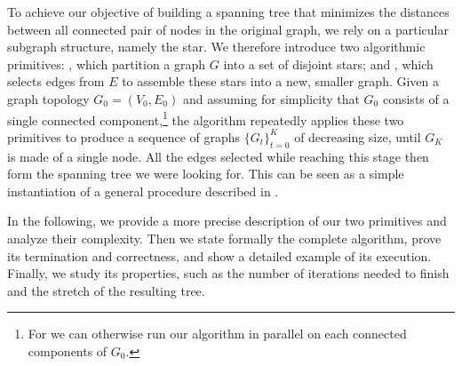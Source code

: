 To achieve our objective of building a spanning tree that minimizes the distances between all
connected pair of nodes in the original graph, we rely on a particular subgraph structure, namely
the star.  We therefore introduce two algorithmic primitives: \extractStar{}, which partition a
graph $G$ into a set of disjoint stars; and \collapseStar{}, which selects edges from $E$ to
assemble these stars into a new, smaller graph. Given a graph topology $G_0=(V_0, E_0)$ and assuming
for simplicity that $G_0$ consists of a single connected component,\footnote{For we can otherwise
run our algorithm in parallel on each connected components of $G_0$.} the \gtx{} algorithm
repeatedly applies these two primitives to produce a sequence of graphs $\{G_t\}_{t=0}^K$ of
decreasing size, until $G_K$ is made of a single node. All the edges selected while reaching
this stage then form the spanning tree we were looking for.
This can be seen as a simple instantiation of a general procedure described in \autocite[Section
5.2]{LowerBound95}.

In the following, we provide a more precise description of our two primitives and analyze their
complexity. Then we state formally the complete \gtx{} algorithm, prove its termination and
correctness, and show a detailed example of its execution.  Finally, we study its properties, such
as the number of iterations needed to finish and the stretch of the resulting tree.

